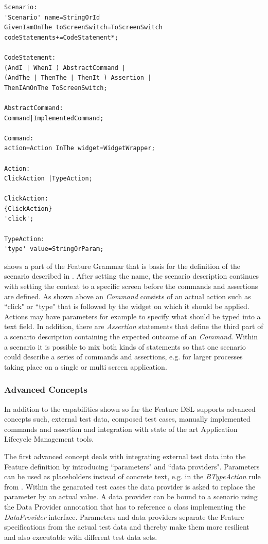 \documentclass{sig-alternate-05-2015}
\begin{document}
{%
\begin{lstlisting}[captionpos=b, caption=Feature Grammar, label={lst:featureGrammar}, language=xtext]
Scenario:
'Scenario' name=StringOrId
GivenIamOnThe toScreenSwitch=ToScreenSwitch 
codeStatements+=CodeStatement*;

CodeStatement:
(AndI | WhenI ) AbstractCommand | 
(AndThe | ThenThe | ThenIt ) Assertion |   
ThenIAmOnThe ToScreenSwitch;

AbstractCommand:
Command|ImplementedCommand;

Command:
action=Action InThe widget=WidgetWrapper;

Action:
ClickAction |TypeAction;

ClickAction:
{ClickAction}
'click';

TypeAction:
'type' value=StringOrParam;
\end{lstlisting}

 shows a part of the Feature Grammar that is basis for the definition of the scenario described in .
After setting the name, the scenario description continues with setting the context to a specific screen before the commands and assertions are defined.
As shown above an \textit{Command} consists of an actual action such as ``click" or ``type" that is followed by the widget on which it should be applied.
Actions may have parameters for example to specify what should be typed into a text field. 
In addition, there are \textit{Assertion} statements that define the third part of a scenario description containing the expected outcome of an \textit{Command}.
Within a scenario it is possible to mix both kinds of statements so that one scenario could describe a series of commands and assertions, e.g. for larger processes taking place on a single or multi screen application.   

\subsubsection{Advanced Concepts}
In addition to the capabilities shown so far the Feature DSL supports advanced concepts such, external test data, composed test cases, manually implemented commands and assertion and integration with state of the art Application Lifecycle Management tools.
 
The first advanced concept deals with integrating external test data into the Feature definition by introducing ``parameters" and ``data providers".
Parameters can be used as placeholders instead of concrete text, e.g. in the \textit{BTypeAction} rule from .
Within the genarated test cases the data provider is asked to replace the parameter by an actual value.
A data provider can be bound to a scenario using the Data Provider annotation that has to reference a class implementing the \textit{DataProvider} interface.
Parameters and data providers separate the Feature specifications from the actual test data and thereby make them more resilient and also executable with different test data sets.

}
\end{document}
